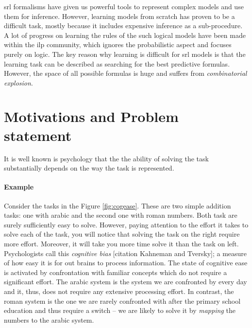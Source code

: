\gls{srl} formalisms have given us powerful tools to represent complex models and use them for inference.
However, learning models from scratch has proven to be a difficult task, mostly because it includes expensive inference as a sub-procedure.
A lot of progress on learning the rules of the such logical models have been made within the \gls{ilp} community, which ignores the probabilistic aspect and focuses purely on logic.
The key reason why learning is difficult for \gls{srl} models is that the learning task can be described as searching for the best predictive formulas.
However, the space of all possible formulas is huge and suffers from \textit{combinatorial explosion}.










\section{Motivations and Problem statement}

It is well known is psychology that the the ability of solving the task substantially depends on the way the task is represented.

 
\paragraph{Example} Consider the tasks in the Figure \ref{fig:cogease}.
These are two simple addition tasks: one with arabic and the second one with roman numbers.
Both task are surely sufficiently easy to solve. 
However, paying attention to the effort it takes to solve each of the task, you will notice that solving the task on the right require more effort.
Moreover, it will take you more time solve it than the task on left.
Psychologists call this \textit{cognitive bias} [citation Kahneman and Tversky]; a measure of how easy it is for out brains to process information.
The state of cognitive ease is activated by confrontation with familiar concepts which do not require a significant effort.
The arabic system is the system we are confronted by every day and it, thus, does not require any extensive processing effort.
In contrast, the roman system is the one we are rarely confronted with after the primary school education and thus require a switch -- we are likely to solve it by \textit{mapping} the numbers to the arabic system.


 


